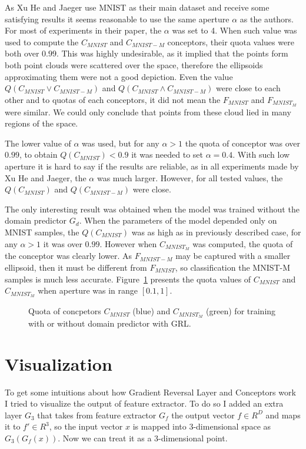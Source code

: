 \documentclass{article}
\begin{document}
\par
As Xu He and Jaeger use MNIST as their main dataset and receive some satisfying results it seems reasonable to use the same aperture $\alpha$ as the authors. For most of experiments in their paper, the $\alpha$ was set to 4. When such value was used to compute the $C_{MNIST}$ and $C_{MNIST-M}$ conceptors, their quota values were both over $0.99$. This was highly undesirable, as it implied that the points form both point clouds were scattered over the space, therefore the ellipsoids approximating them were not a good depiction. Even the value $Q(C_{MNIST} \vee C_{MNIST-M} )$ and $Q(C_{MNIST} \wedge C_{MNIST-M} )$ were close to each other and to quotas of each conceptors, it did not mean the $F_{MNIST}$ and $F_{MNIST_M}$ were similar. We could only conclude that points from these cloud lied in many regions of the space. 
\par
The lower value of $\alpha$ was used, but for any $\alpha > 1$ the quota of conceptor was over $0.99$, to obtain $Q(C_{MNIST}) < 0.9$ it was needed to set $\alpha = 0.4$. With such low aperture it is hard to say if the results are reliable, as in all experiments made by Xu He and Jaeger, the $\alpha$ was much larger. However, for all tested values, the $Q(C_{MNIST})$ and $Q(C_{MNIST-M})$ were close.
\par
The only interesting result was obtained when the model was trained without the domain predictor $G_{d}$. When the parameters of the model depended only on MNIST samples, the $Q(C_{MNIST})$ was as high as in previously described case, for any $\alpha > 1$ it was over $0.99$. However when $C_{MNIST_M}$ was computed, the quota of the conceptor was clearly lower. As $F_{MNIST-M}$ may be captured with a smaller ellipsoid, then it must be different from $F_{MNIST}$, so classification the MNIST-M samples is much less accurate. Figure~\ref{fig:Q(C)} presents the quota values of $C_{MNIST}$ and $C_{MNIST_M}$ when aperture was in range $[0.1, 1]$.

\begin{figure}
    \centering
    \qquad
    \caption{Quota of concpetors $C_{MNIST}$ (blue) and $C_{MNIST_M}$ (green) for training with or without domain predictor with GRL.}%
    \label{fig:Q(C)}%
\end{figure}

\section{Visualization}
\par
To get some intuitions about how Gradient Reversal Layer and Conceptors work I tried to visualize the output of feature extractor. To do so I added an extra layer $G_{3}$ that takes from feature extractor $G_{f}$ the output vector ${ f } \in { R } ^ { D }$ and maps it to ${f'} \in {R}^{3}$, so the input vector ${x}$ is mapped into 3-dimensional space as $G_{3}(G_{f}(x))$. Now we can treat it as a 3-dimensional point. 
\end{document}
